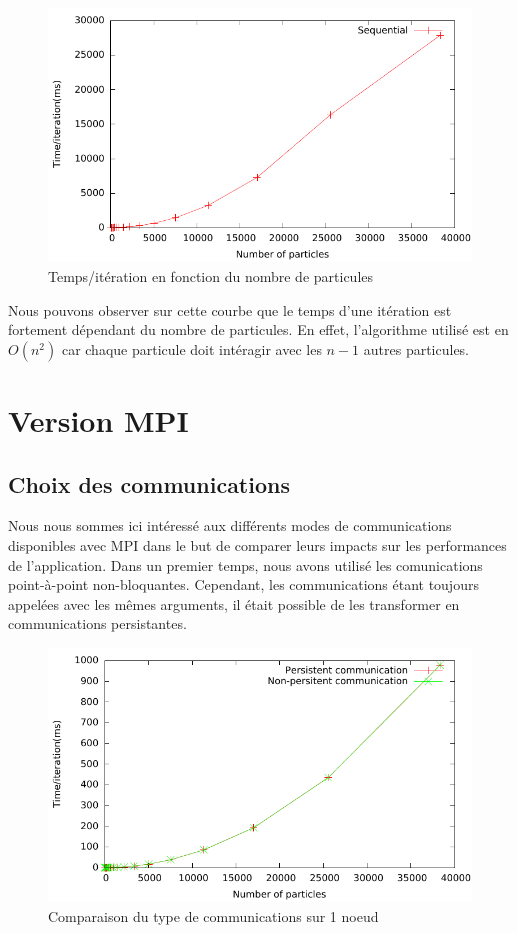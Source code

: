 \documentclass{article}
\begin{document}
\begin{figure}[h]
  \centering
  \includegraphics[scale=0.7]{ResultTDP2/seq_temps_iter/seq.pdf}
  \caption{\label{seq_ti}Temps/itération en fonction du nombre de particules}
  
\end{figure}
Nous pouvons observer sur cette courbe que le temps d'une itération est fortement dépendant du nombre de particules. En effet, l'algorithme utilisé est en $ O(n^2) $ car chaque particule doit intéragir avec les $ n-1 $ autres particules.


\section{Version MPI}
\subsection{Choix des communications}
Nous nous sommes ici intéressé aux différents modes de communications disponibles avec MPI dans le but de comparer leurs impacts sur les performances de l'application. Dans un premier temps, nous avons utilisé les comunications point-à-point non-bloquantes. Cependant, les communications étant toujours appelées avec les mêmes arguments, il était possible de les transformer en communications persistantes.

\begin{figure}[h]
  \centering
  \includegraphics[scale=0.5]{ResultTDP2/mpi_comm/mpi_comm_singlenode.pdf}
  \caption{\label{fig:tf(n)1}Comparaison du type de communications sur 1 noeud}
\end{figure}
\end{document}
